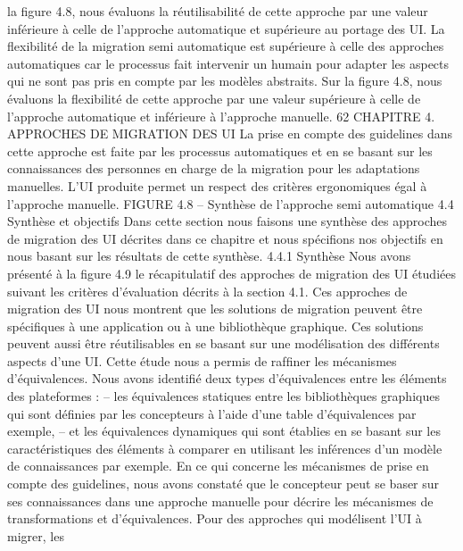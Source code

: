 \documentclass{article}
\begin{document}
la ﬁgure 4.8, nous \'{e}valuons la r\'{e}utilisabilit\'{e} de cette approche par une valeur inf\'{e}rieure \`{a} celle de
l’approche automatique et sup\'{e}rieure au portage des UI.
La ﬂexibilit\'{e} de la migration semi automatique est sup\'{e}rieure \`{a} celle des approches automatiques
car le processus fait intervenir un humain pour adapter les aspects qui ne sont pas pris en compte par
les mod\`{e}les abstraits. Sur la ﬁgure 4.8, nous \'{e}valuons la ﬂexibilit\'{e} de cette approche par une valeur
sup\'{e}rieure \`{a} celle de l’approche automatique et inf\'{e}rieure \`{a} l’approche manuelle.
62
CHAPITRE 4. APPROCHES DE MIGRATION DES UI
La prise en compte des guidelines dans cette approche est faite par les processus automatiques
et en se basant sur les connaissances des personnes en charge de la migration pour les adaptations
manuelles. L’UI produite permet un respect des crit\`{e}res ergonomiques \'{e}gal \`{a} l’approche manuelle.
FIGURE 4.8 – Synth\`{e}se de l’approche semi automatique
4.4
Synth\`{e}se et objectifs
Dans cette section nous faisons une synth\`{e}se des approches de migration des UI d\'{e}crites dans ce
chapitre et nous sp\'{e}ciﬁons nos objectifs en nous basant sur les r\'{e}sultats de cette synth\`{e}se.
4.4.1
Synth\`{e}se
Nous avons pr\'{e}sent\'{e} \`{a} la ﬁgure 4.9 le r\'{e}capitulatif des approches de migration des UI \'{e}tudi\'{e}es suivant les crit\`{e}res d’\'{e}valuation d\'{e}crits \`{a} la section 4.1. Ces approches de migration des UI nous montrent
que les solutions de migration peuvent \^{e}tre sp\'{e}ciﬁques \`{a} une application ou \`{a} une biblioth\`{e}que graphique. Ces solutions peuvent aussi \^{e}tre r\'{e}utilisables en se basant sur une mod\'{e}lisation des diff\'{e}rents
aspects d’une UI.
Cette \'{e}tude nous a permis de rafﬁner les m\'{e}canismes d’\'{e}quivalences. Nous avons identiﬁ\'{e} deux
types d’\'{e}quivalences entre les \'{e}l\'{e}ments des plateformes :
– les \'{e}quivalences statiques entre les biblioth\`{e}ques graphiques qui sont d\'{e}ﬁnies par les concepteurs \`{a} l’aide d’une table d’\'{e}quivalences par exemple,
– et les \'{e}quivalences dynamiques qui sont \'{e}tablies en se basant sur les caract\'{e}ristiques des \'{e}l\'{e}ments \`{a} comparer en utilisant les inf\'{e}rences d’un mod\`{e}le de connaissances par exemple.
En ce qui concerne les m\'{e}canismes de prise en compte des guidelines, nous avons constat\'{e} que
le concepteur peut se baser sur ses connaissances dans une approche manuelle pour d\'{e}crire les m\'{e}canismes de transformations et d’\'{e}quivalences. Pour des approches qui mod\'{e}lisent l’UI \`{a} migrer, les
\end{document}
